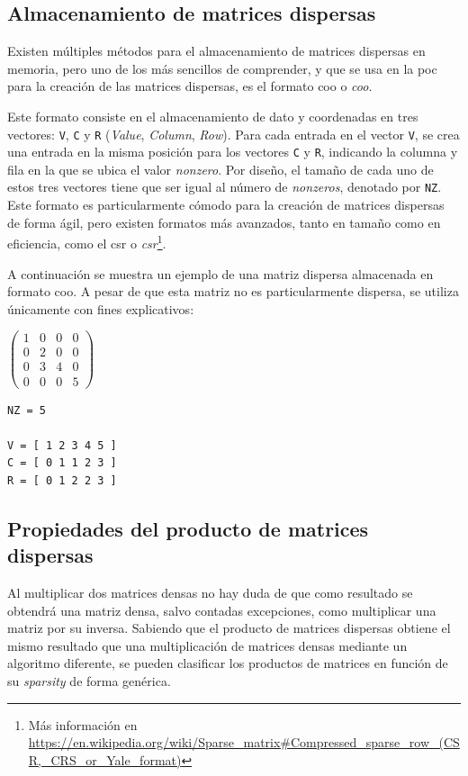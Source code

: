\subsection{Almacenamiento de matrices dispersas}
\label{ssec:almacenamiento_matrices_dispersas}
Existen múltiples métodos para el almacenamiento de matrices dispersas en memoria, pero uno de los más sencillos de comprender, y que se usa en la \acrshort{poc} para la creación de las matrices dispersas, es el formato \acrshort{coo} o \textit{\acrlong{coo}}.

Este formato consiste en el almacenamiento de dato y coordenadas en tres vectores: \texttt{V}, \texttt{C} y \texttt{R} (\textit{Value}, \textit{Column}, \textit{Row}). Para cada entrada en el vector \texttt{V}, se crea una entrada en la misma posición para los vectores \texttt{C} y \texttt{R}, indicando la columna y fila en la que se ubica el valor \textit{nonzero}. Por diseño, el tamaño de cada uno de estos tres vectores tiene que ser igual al número de \textit{nonzeros}, denotado por \texttt{NZ}. Este formato es particularmente cómodo para la creación de matrices dispersas de forma ágil, pero existen formatos más avanzados, tanto en tamaño como en eficiencia, como el \acrshort{csr} o \textit{\acrlong{csr}}\footnote{Más información en \url{https://en.wikipedia.org/wiki/Sparse_matrix\#Compressed_sparse_row_(CSR,\_CRS\_or\_Yale\_format)}}.

A continuación se muestra un ejemplo de una matriz dispersa almacenada en formato \acrshort{coo}. A pesar de que esta matriz no es particularmente dispersa, se utiliza únicamente con fines explicativos:

\begin{center}
    $\begin{pmatrix}
        1 & 0 & 0 & 0\\
        0 & 2 & 0 & 0\\
        0 & 3 & 4 & 0\\
        0 & 0 & 0 & 5
    \end{pmatrix}$
    \vspace*{0.5cm}
\begin{lstlisting}[]
NZ = 5

V = [ 1 2 3 4 5 ]
C = [ 0 1 1 2 3 ]
R = [ 0 1 2 2 3 ]
\end{lstlisting}
\end{center}

\subsection{Propiedades del producto de matrices dispersas}
\label{ssec:propiedades_producto_matrices_dispersas}
Al multiplicar dos matrices densas no hay duda de que como resultado se obtendrá una matriz densa, salvo contadas excepciones, como multiplicar una matriz por su inversa. Sabiendo que el producto de matrices dispersas obtiene el mismo resultado que una multiplicación de matrices densas mediante un algoritmo diferente, se pueden clasificar los productos de matrices en función de su \textit{sparsity} de forma genérica.

